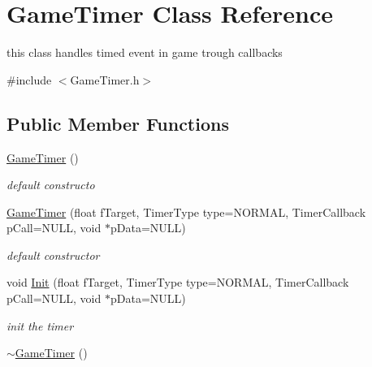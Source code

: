 \hypertarget{class_game_timer}{\section{Game\-Timer Class Reference}
\label{class_game_timer}
}


this class handles timed event in game trough callbacks  




{\ttfamily \#include $<$Game\-Timer.\-h$>$}

\subsection*{Public Member Functions}
\begin{DoxyCompactItemize}
\item 
\hypertarget{class_game_timer_a439d589144db6da4918453e6f2a3c412}{\hyperlink{class_game_timer_a439d589144db6da4918453e6f2a3c412}{Game\-Timer} ()}\label{class_game_timer_a439d589144db6da4918453e6f2a3c412}

\begin{DoxyCompactList}\small\item\em default constructo \end{DoxyCompactList}\item 
\hypertarget{class_game_timer_af44ea56b0714b4e13ea1dffb93075461}{\hyperlink{class_game_timer_af44ea56b0714b4e13ea1dffb93075461}{Game\-Timer} (float f\-Target, Timer\-Type type=N\-O\-R\-M\-A\-L, Timer\-Callback p\-Call=N\-U\-L\-L, void $\ast$p\-Data=N\-U\-L\-L)}\label{class_game_timer_af44ea56b0714b4e13ea1dffb93075461}

\begin{DoxyCompactList}\small\item\em default constructor \end{DoxyCompactList}\item 
\hypertarget{class_game_timer_abc91dded45674fd4a2feef6713b6e01e}{void \hyperlink{class_game_timer_abc91dded45674fd4a2feef6713b6e01e}{Init} (float f\-Target, Timer\-Type type=N\-O\-R\-M\-A\-L, Timer\-Callback p\-Call=N\-U\-L\-L, void $\ast$p\-Data=N\-U\-L\-L)}\label{class_game_timer_abc91dded45674fd4a2feef6713b6e01e}

\begin{DoxyCompactList}\small\item\em init the timer \end{DoxyCompactList}\item 
\hypertarget{class_game_timer_a0183c9b170c99bfc9b884e92b37610bd}{\hyperlink{class_game_timer_a0183c9b170c99bfc9b884e92b37610bd}{$\sim$\-Game\-Timer} ()}\label{class_game_timer_a0183c9b170c99bfc9b884e92b37610bd}


\end{DoxyCompactItemize}
